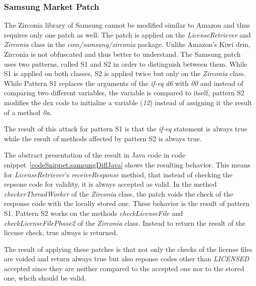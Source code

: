 \subsubsection{Samsung Market Patch}
The Zirconia library of Samsung cannot be modified similar to Amazon and thus requires only one patch as well.
The patch is applied on the \textit{LicenseRetriever} and \textit{Zirconia} class in the \textit{com/samsung/zirconia} package.
Unlike Amazon's Kiwi \gls{drm}, Zirconia is not obfuscated and thus better to understand.
The Samsung patch uses two patterns, called S1 and S2 in order to distinguish between them.
While S1 is applied on both classes, S2 is applied twice but only on the \textit{Zirconia} class.
\newline
While Pattern S1 replaces the arguments of the \textit{if-eq} \textit{d6} with \textit{00} and instead of comparing two different variables, the variable is compared to itself, pattern S2 modifies the dex code to initialize a variable (\textit{12}) instead of assigning it the result of a method {\textit{0a}}.
\newline

The result of this attack for pattern S1 is that the \textit{if-eq} statement is always true while the result of methods affected by pattern S2 is always true.
\newline

The abstract presentation of the result in Java code in code snippet~\ref{codeSnippet:samsungDiffJava} shows the resulting behavior.
This means for \textit{LicenseRetriever}'s \textit{receiveResponse} method, that instead of checking the repsone code for validity, it is always accepted as valid.
In the method \textit{checkerThreadWorker} of the \textit{Zirconia} class, the patch voids the check of the response code with the locally stored one.
These behavior is the result of pattern S1.
Pattern S2 works on the methods \textit{checkLicenseFile} and \textit{checkLicenseFilePhase2} of the \textit{Zirconia} class.
Instead to return the result of the license check, true always is returned.
\newline

The result of applying these patches is that not only the checks of the license files are voided and return always true but also reponse codes other than \textit{LICENSED} accepted since they are neither compared to the accepted one nor to the stored one, whcih should be valid.

